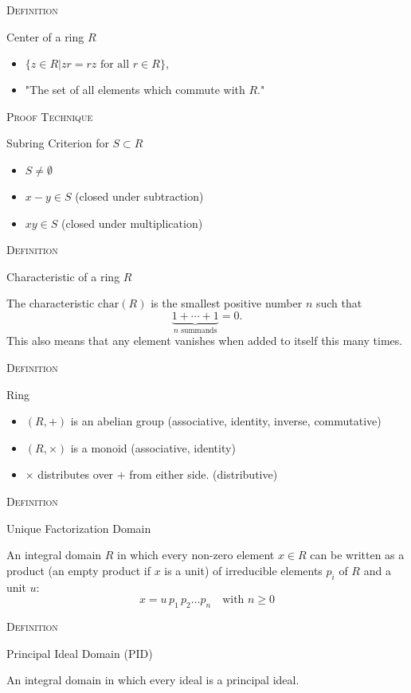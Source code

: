 \documentclass{article}
\newenvironment{flashcard}[2][]{%
\noindent  \textsc{#1}

\vfill 
\centerline{{\Large{#2}}}
\vfill
\newpage \vspace*{\stretch{1}} \noindent
}
{\vspace*{\stretch{1}}\newpage}
\begin{document}
\begin{flashcard}[Definition]{Center of a ring $R$}
\begin{itemize}
\item $\{z\in R | zr=rz \text{ for all } r\in R\},$
\item "The set of all elements which commute with $R$." 
\end{itemize}
\end{flashcard}

\begin{flashcard}[Proof Technique]{Subring Criterion for $S\subset R$}
\begin{itemize}
\item $S\neq\emptyset$
\item $x-y\in S$ (closed under subtraction)
\item $xy\in S$ (closed under multiplication)
\end{itemize}
\end{flashcard}

\begin{flashcard}[Definition]{Characteristic of a ring $R$}
The characteristic $\text{char}(R)$ is the smallest positive number $n$ such that
$${\displaystyle \underbrace {1+\cdots +1} _{n{\text{ summands}}}=0.}$$
This also means that any element vanishes when added to itself this many times. 
\end{flashcard}

\begin{flashcard}[Definition]{Ring}
\begin{itemize}
\item $(R,+)$ is an abelian group (associative, identity, inverse, commutative) 
\item $(R,\times)$ is a monoid (associative, identity) 
\item $\times$ distributes over $+$ from either side. (distributive)
\end{itemize}
\end{flashcard}

\begin{flashcard}[Definition]{Unique Factorization Domain}
An integral domain $R$ in which every non-zero element $x\in R$ can be written as a product (an empty product if $x$ is a unit) of irreducible elements $p_i$ of $R$ and a unit $u$:
$$x = u \, p_1 \, p_2 \dots p_n \quad \text{with } n \geq 0$$
\end{flashcard}

\begin{flashcard}[Definition]{Principal Ideal Domain (PID)}
An integral domain in which every ideal is a principal ideal. 
\end{flashcard}
\end{document}
